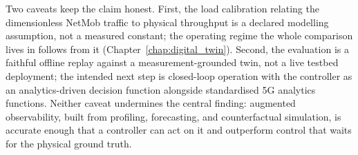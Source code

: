 \documentclass[12pt, a4paper]{report}
\begin{document}
Two caveats keep the claim honest. First, the load calibration relating the
dimensionless NetMob traffic to physical throughput is a declared modelling
assumption, not a measured constant; the operating regime the whole comparison
lives in follows from it (Chapter~\ref{chap:digital_twin}). Second, the
evaluation is a faithful offline replay against a measurement-grounded twin, not
a live testbed deployment; the intended next step is closed-loop operation with
the controller as an analytics-driven decision function alongside standardised
5G analytics functions. Neither caveat undermines the central finding: augmented
observability, built from profiling, forecasting, and counterfactual simulation,
is accurate enough that a controller can act on it and outperform control that
waits for the physical ground truth.
\end{document}
